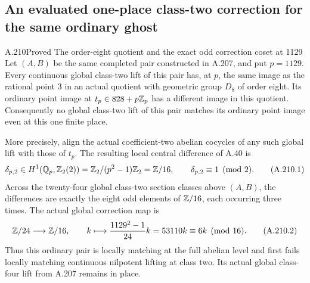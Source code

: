 \subsection{An evaluated one-place class-two correction for the same ordinary ghost}

\begin{statement}{A.210}{Proved}
{The order-eight quotient and the exact odd correction coset at 1129}
Let \((A,B)\) be the same completed pair constructed in A.207,
and put \(p=1129\).  Every continuous global class-two lift
of this pair has, at \(p\), the same image as the rational
point \(3\) in an actual quotient with geometric group
\(D_8\) of order eight.  Its ordinary point image at
\(t_p\in828+p\mathbb Z_p\) has a different image in this quotient.
Consequently no global class-two lift of this pair matches
its ordinary point image even at this one finite place.

More precisely, align the actual coefficient-two abelian
cocycles of any such global lift with those of \(t_p\).
The resulting local central difference of A.40 is
\[
 \delta_{p,2}\in H^1(\mathbb Q_p,\mathbb Z_2(2))
       =\mathbb Z_2/(p^2-1)\mathbb Z_2=\mathbb Z/16,
                 \qquad\delta_{p,2}\equiv1\pmod2.
\tag{A.210.1}
\]
Across the twenty-four global class-two section classes
above \((A,B)\), the differences are exactly the eight
odd elements of \(\mathbb Z/16\), each occurring three times.
The actual global correction map is
\[
 \mathbb Z/24\longrightarrow\mathbb Z/16,\qquad
 k\longmapsto\frac{1129^2-1}{24}k
                     =53110k\equiv6k\pmod {16}.
\tag{A.210.2}
\]
Thus this ordinary pair is locally matching at the full
abelian level and first fails locally matching continuous
nilpotent lifting at class two.  Its actual global
class-four lift from A.207 remains in place.
\end{statement}


